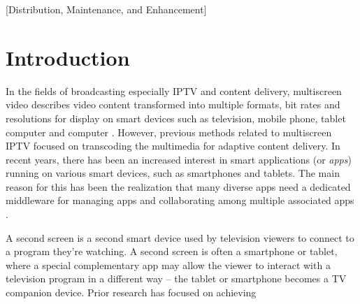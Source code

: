 \documentclass{sig-alternate}
\begin{document}
[Distribution, Maintenance, and Enhancement]


%
\section{Introduction}
In the fields of broadcasting especially IPTV and content delivery, multiscreen video describes video content transformed into multiple formats, bit rates and resolutions for display on smart devices such as television, mobile phone, tablet computer and computer \cite{Lucent2011}.
However, previous methods related to multiscreen IPTV focused on transcoding the multimedia for adaptive content delivery. 
In recent years, there has been an increased interest in smart applications (or \textit{apps}) running on various smart devices, such as smartphones and tablets. 
The main reason for this has been the realization that many diverse apps need a dedicated middleware for managing apps and collaborating among multiple associated apps 
\cite{
samsung:2014, 			%
Aarts:2004, 			%
Anstead:2014, 			%
Barkhuus:2009, 			%
DBLP:FuentesPCM06, 	%
Longo:2013, 			%
Lucent2011,			%
Ma:2008,				%
Motti:2013,			%
Nandakumar:2014, 		%
Sadri:2011, 			%
DBLP:SchmohlB08}. 		%

A second screen is a second smart device used by television viewers to connect to a program they're watching. 
A second screen is often a smartphone or tablet, where a special complementary app may allow the viewer to interact with a television program in a different way -- the tablet or smartphone becomes a TV companion device. Prior research has focused on achieving 
\end{document}
